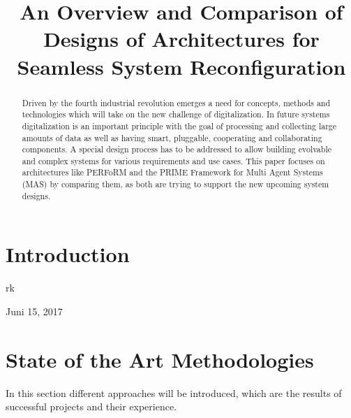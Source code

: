 \documentclass[conference,compsoc]{IEEEtran}
\begin{document}
%
\title{An Overview and Comparison of Designs of Architectures for Seamless System Reconfiguration}


\author{
}

\maketitle

\begin{abstract}
Driven by the fourth industrial revolution emerges a need for concepts, methods and technologies which will take on the new challenge of digitalization. In future systems digitalization is an important principle with the goal of processing and collecting large amounts of data as well as having smart, pluggable, cooperating and collaborating components. A special design process has to be addressed to allow building evolvable and complex systems for various requirements and use cases. This paper focuses on architectures like PERFoRM and the PRIME Framework for Multi Agent Systems (MAS) by comparing them, as both are trying to support the new upcoming system designs.
\end{abstract}

\section{Introduction} %

\lipsum[1-6]


\hfill rk

\hfill Juni 15, 2017


\IEEEpeerreviewmaketitle

\section{State of the Art Methodologies} %
In this section different approaches will be introduced, which are the results of successful projects and their experience. 
\end{document}

